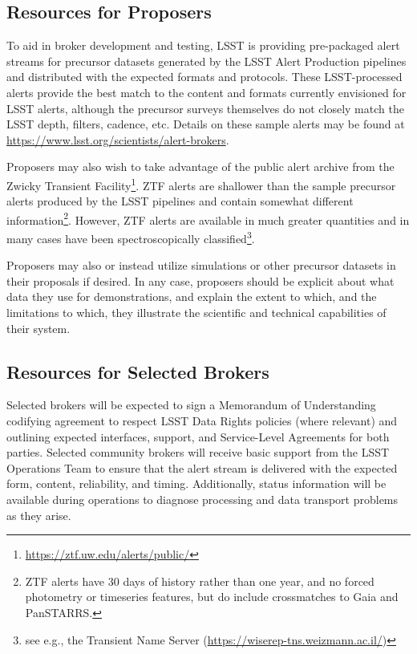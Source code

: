 \subsection{Resources for Proposers}

To aid in broker development and testing, LSST is providing pre-packaged alert streams for precursor datasets generated by the LSST Alert Production pipelines and distributed with the expected formats and protocols.
These LSST-processed alerts provide the best match to the content and formats currently envisioned for LSST alerts, although the precursor surveys themselves do not closely match the LSST depth, filters, cadence, etc.
Details on these sample alerts may be found at \url{https://www.lsst.org/scientists/alert-brokers}.

Proposers may also wish to take advantage of the public alert archive from the Zwicky Transient Facility\footnote{\url{https://ztf.uw.edu/alerts/public/}}. 
ZTF alerts are shallower than the sample precursor alerts produced by the LSST pipelines and contain somewhat different information\footnote{ZTF alerts have
30 days of history rather than one year, and no forced photometry or
timeseries features, but do include crossmatches to Gaia and PanSTARRS.}.
However, ZTF alerts are available in much greater quantities and in many
cases have been spectroscopically classified\footnote{see e.g., the Transient
Name Server (\url{https://wiserep-tns.weizmann.ac.il/})}.

Proposers may also or instead utilize simulations or other precursor datasets in their proposals if desired.  
In any case, proposers should be explicit about what data they use for demonstrations, and explain the extent to which, and the limitations to which, they illustrate the scientific and technical capabilities of their system.

\subsection{Resources for Selected Brokers}

Selected brokers will be expected to sign a Memorandum of Understanding codifying agreement to respect LSST Data Rights policies (where relevant) and outlining expected interfaces, support, and Service-Level Agreements for both parties.
Selected community brokers will receive basic support from the LSST Operations Team to ensure that the alert stream is delivered with the expected form, content, reliability, and timing.
Additionally, status information will be available during operations to diagnose processing and data transport problems as they arise.

